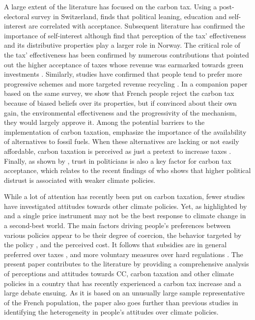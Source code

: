 \documentclass[english,5p,authoryear]{elsarticle}
\begin{document}
%
A large extent of the literature has focused on the carbon tax. Using a post-electoral survey in Switzerland, \citet{thalmann_public_2004} finds that political leaning, education and self-interest are correlated with acceptance. Subsequent literature has confirmed the importance of self-interest \citep[e.g.][]{fischer_et_al_2011,baranzini_effectiveness_2017} although \cite{kallbekken_saelen_2011} find that perception of the tax' effectiveness and its distributive properties play a larger role in Norway. The critical role of the tax' effectiveness has been confirmed by numerous contributions that pointed out the higher acceptance of taxes whose revenue was earmarked towards green investments \citep[e.g.][]{saelen_kallbekken_2011,baranzini_effectiveness_2017}. Similarly, studies have confirmed that people tend to prefer more progressive schemes \citep{brannlund_tax_2012,gevrek_public_2015} and more targeted revenue recycling \citep{kallbekken_et_al_2011}. In a companion paper \citep{douenne_can_2019} based on the same survey, we show that French people reject the carbon tax because of biased beliefs over its properties, but if convinced about their own gain, the environmental effectiveness and the progressivity of the mechanism, they would largely approve it. Among the potential barriers to the implementation of carbon taxation, \citet{kallbekken_aasen_2010} emphasize the importance of the availability of alternatives to fossil fuels. When these alternatives are lacking or not easily affordable, carbon taxation is perceived as just a pretext to increase taxes \citep{dresner_social_2006,klok_et_al_2006}. Finally, as shown by \citet{harring_jagers_2013}, trust in politicians is also a key factor for carbon tax acceptance, which relates to the recent findings of \citet{rafaty_perceptions_2018} who shows that higher political distrust is associated with weaker climate policies.
%
%
%

%
While a lot of attention has recently been put on carbon taxation, fewer studies have investigated attitudes towards other climate policies. Yet, as highlighted by \citet{stern_report_2017} and \citet{stiglitz_addressing_2019} a single price instrument may not be the best response to climate change in a second-best world. The main factors driving people's preferences between various policies appear to be their degree of coercion, the behavior targeted by the policy \citep{de_groot_schuitema_2012}, and the perceived cost. It follows that subsidies are in general preferred over taxes \citep[e.g.][]{tobler_et_al_2012,cherry_accepting_2017}, and more voluntary measures over hard regulations \citep{attari_et_al_2009}. The present paper contributes to the literature by providing a comprehensive analysis of perceptions and attitudes towards CC, carbon taxation and other climate policies in a country that has recently experienced a carbon tax increase and a large debate ensuing. As it is based on an unusually large sample representative of the French population, the paper also goes further than previous studies in identifying the heterogeneity in people's attitudes over climate policies. %
%
\end{document}
